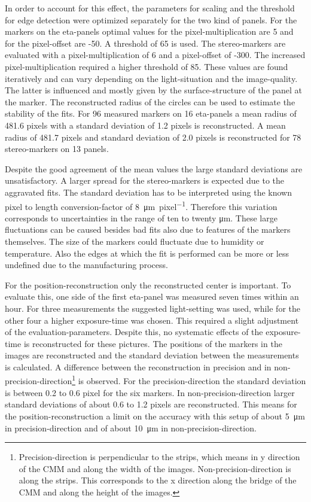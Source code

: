 \documentclass[
twoside,            %
BCOR1.4cm,          %
10pt,               %
headings=normal,    %
headsepline,        %
clearplainpage,		%
final,              %
div=14,
open=right,
bibliography=toc
]{scrreprt}
\begin{document}
In order to account for this effect, the parameters for scaling and the threshold for edge detection were optimized separately for the two kind of panels.
For the markers on the eta-panels optimal values for the pixel-multiplication are 5 and for the pixel-offset are -50.
A threshold of 65 is used.
The stereo-markers are evaluated with a pixel-multiplication of 6 and a pixel-offset of -300.
The increased pixel-multiplication required a higher threshold of 85.
These values are found iteratively and can vary depending on the light-situation and the image-quality.
The latter is influenced and mostly given by the surface-structure of the panel at the marker.
The reconstructed radius of the circles can be used to estimate the stability of the fits.
For 96 measured markers on 16 eta-panels a mean radius of 481.6 pixels with a standard deviation of 1.2 pixels is reconstructed.
A mean radius of 481.7 pixels and standard deviation of 2.0 pixels is reconstructed for 78 stereo-markers on 13 panels.

Despite the good agreement of the mean values the large standard deviations are unsatisfactory.
A larger spread for the stereo-markers is expected due to the aggravated fits.
The standard deviation has to be interpreted using the known pixel to length conversion-factor of \SI{8}{\micro\m\per pixel}.
Therefore this variation corresponds to uncertainties in the range of ten to twenty \si{\micro\m}.
These large fluctuations can be caused besides bad fits also due to features of the markers themselves.
The size of the markers could fluctuate due to humidity or temperature.
Also the edges at which the fit is performed can be more or less undefined due to the manufacturing process.

For the position-reconstruction only the reconstructed center is important.
To evaluate this, one side of the first eta-panel was measured seven times within an hour.
For three measurements the suggested light-setting was used, while for the other four a higher exposure-time was chosen.
This required a slight adjustment of the evaluation-parameters.
Despite this, no systematic effects of the exposure-time is reconstructed for these pictures. 
The positions of the markers in the images are reconstructed and the standard deviation between the measurements is calculated.
A difference between the reconstruction in precision and in non-precision-direction\footnote{
	Precision-direction is perpendicular to the strips, which means in y direction of the CMM and along the width of the images.
	Non-precision-direction is along the strips. 
	This corresponds to the x direction along the bridge of the CMM and along the height of the images.
} is observed.
For the precision-direction the standard deviation is between 0.2 to 0.6 pixel for the six markers.
In non-precision-direction larger standard deviations of about 0.6 to 1.2 pixels are reconstructed.
This means for the position-reconstruction a limit on the accuracy with this setup of about \SI{5}{\micro\m} in precision-direction and of about \SI{10}{\micro\m} in non-precision-direction.
\end{document}
